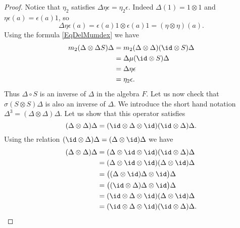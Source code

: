 \begin{proof}
	Notice that \( \eta_2\) satisfies \( \Delta\eta\epsilon=\eta_2\epsilon\). Indeed \( \Delta(1)=1\otimes 1\) and \( \eta\epsilon(a)=\epsilon(a)1\), so
	\begin{equation}
		\Delta\eta\epsilon(a)=\epsilon(a)1\otimes\epsilon(a)1=(\eta\otimes \eta)(a).
	\end{equation}
	Using the formula \eqref{EqDelMumdex} we have
	\begin{equation}
		\begin{aligned}[]
			m_2(\Delta\otimes\Delta S)\Delta & =m_2(\Delta\otimes\Delta)(\id\otimes S)\Delta \\
			                                 & =\Delta\mu(\id\otimes S)\Delta                \\
			                                 & =\Delta\eta\epsilon                           \\
			                                 & =\eta_2\epsilon.
		\end{aligned}
	\end{equation}
	Thus \( \Delta\circ S\) is an inverse of \( \Delta\) in the algebra \( F\). Let us now check that \( \sigma(S\otimes S)\Delta\) is also an inverse of \( \Delta\). We introduce the short hand notation \( \Delta^3=(\Delta\otimes \Delta)\Delta\). Let us show that this operator satisfies
	\begin{equation}        \label{EqDDDrelDifetc}
		(\Delta\otimes\Delta)\Delta=(\id\otimes\Delta\otimes\id)(\id\otimes\Delta)\Delta.
	\end{equation}
	Using the relation \( (\id\otimes\Delta)\Delta=(\Delta\otimes\id)\Delta\) we have
	\begin{equation}
		\begin{aligned}[]
			(\Delta\otimes\Delta)\Delta & =(\Delta\otimes\id\otimes\id)(\id\otimes\Delta)\Delta  \\
			                            & =(\Delta\otimes\id\otimes\id)(\Delta\otimes\id)\Delta  \\
			                            & =\big( (\Delta\otimes\id)\Delta\otimes\id \big)\Delta  \\
			                            & =\big( (\id\otimes\Delta)\Delta\otimes\id \big)\Delta  \\
			                            & =(\id\otimes\Delta\otimes\id)(\Delta\otimes\id)\Delta  \\
			                            & =(\id\otimes\Delta\otimes\id)(\id\otimes\Delta)\Delta.
		\end{aligned}
	\end{equation}


\end{proof}

